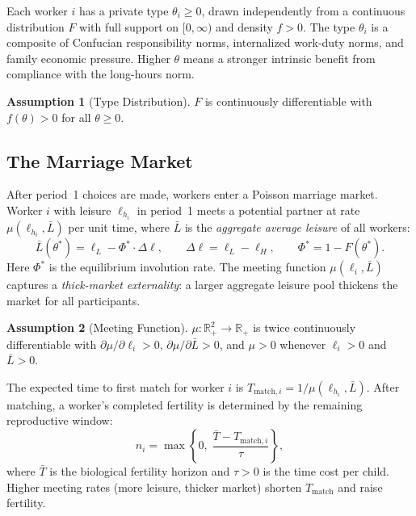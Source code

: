 \documentclass[12pt]{article}
\theoremstyle{plain}
\theoremstyle{definition}
\newtheorem{assumption}{Assumption}
\theoremstyle{remark}
\newcommand{\tstar}{\theta^{*}}
\newcommand{\Lbar}{\bar{L}}
\newcommand{\ellH}{\ell_{H}}
\newcommand{\ellL}{\ell_{L}}
\newcommand{\Phistar}{\Phi^{*}}
\begin{document}
Each worker $i$ has a private type $\theta_{i} \geq 0$, drawn independently from a
continuous distribution $F$ with full support on $[0,\infty)$ and density $f > 0$.
The type $\theta_{i}$ is a composite of Confucian responsibility norms, internalized
work-duty norms, and family economic pressure.  Higher $\theta$ means a stronger
intrinsic benefit from compliance with the long-hours norm.

\begin{assumption}[Type Distribution]
\label{ass:type}
$F$ is continuously differentiable with $f(\theta) > 0$ for all $\theta \geq 0$.
\end{assumption}

\subsection{The Marriage Market}

After period~1 choices are made, workers enter a Poisson marriage market.  Worker $i$
with leisure $\ell_{h_i}$ in period~1 meets a potential partner at rate
$\mu(\ell_{h_i}, \Lbar)$ per unit time, where $\Lbar$ is the \emph{aggregate
average leisure} of all workers:
\begin{equation}
  \Lbar(\tstar) = \ellL - \Phistar \cdot \Delta\ell,
  \qquad
  \Delta\ell = \ellL - \ellH,
  \qquad
  \Phistar = 1 - F(\tstar).
  \label{eq:Lbar}
\end{equation}
Here $\Phistar$ is the equilibrium involution rate.  The meeting function
$\mu(\ell_{i}, \Lbar)$ captures a \emph{thick-market externality}: a larger
aggregate leisure pool thickens the market for all participants.

\begin{assumption}[Meeting Function]
\label{ass:meet}
$\mu : \mathbb{R}_{+}^{2} \to \mathbb{R}_{+}$ is twice continuously differentiable
with $\partial\mu/\partial\ell_{i} > 0$, $\partial\mu/\partial\Lbar > 0$, and
$\mu > 0$ whenever $\ell_{i} > 0$ and $\Lbar > 0$.
\end{assumption}

The expected time to first match for worker $i$ is $T_{\mathrm{match},i} =
1/\mu(\ell_{h_i}, \Lbar)$.  After matching, a worker's completed fertility is
determined by the remaining reproductive window:
\begin{equation}
  n_{i} = \max\!\left\{0,\; \frac{\bar{T} - T_{\mathrm{match},i}}{\tau}\right\},
  \label{eq:fertility}
\end{equation}
where $\bar{T}$ is the biological fertility horizon and $\tau > 0$ is the time
cost per child.  Higher meeting rates (more leisure, thicker market) shorten
$T_{\mathrm{match}}$ and raise fertility.
\end{document}
